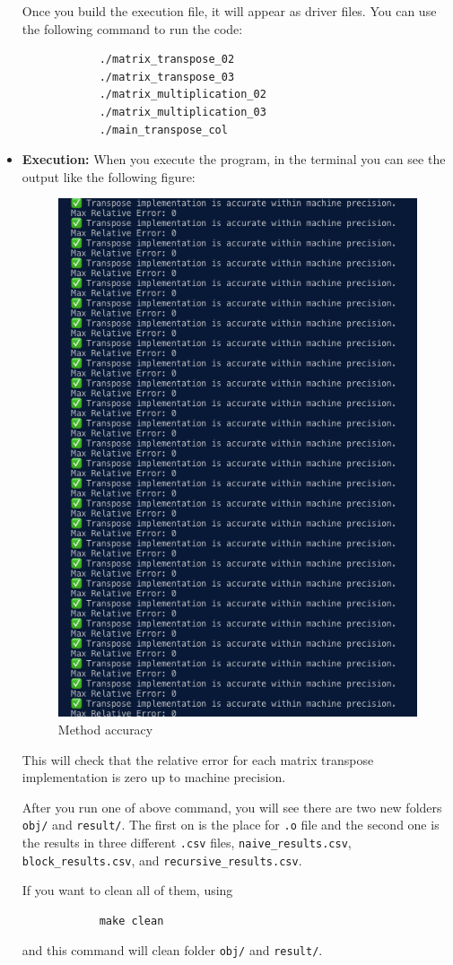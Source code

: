 \documentclass[11pt]{article}
\begin{document}
\begin{itemize}
        Once you build the execution file, it will appear as driver files. You can use the following command to run the code:
        \begin{verbatim}
            ./matrix_transpose_02
            ./matrix_transpose_03
            ./matrix_multiplication_02
            ./matrix_multiplication_03
            ./main_transpose_col
        \end{verbatim}
    \item  \textbf{Execution: }
        When you execute the program, in the terminal you can see the output like the following figure:
        \begin{figure}[H]
            \centering
            \includegraphics[width=0.5\linewidth]{Assignments//HW1//docs//images/method_accuracy.png}
            \caption{Method accuracy}
            \label{fig:Method accuracy}
        \end{figure}
        This will check that the relative error for each matrix transpose implementation is zero up to machine precision.

        After you run one of above command, you will see there are two new folders \texttt{obj/} and \texttt{result/}. The first on is the place for \verb|.o| file and the second one is the results in three different \verb|.csv| files, \verb|naive_results.csv|, \verb|block_results.csv|, and \verb|recursive_results.csv|.

        If you want to clean all of them, using
        \begin{verbatim}
            make clean
        \end{verbatim}
        and this command will clean folder \texttt{obj/} and \texttt{result/}.
\end{itemize}
\end{document}
